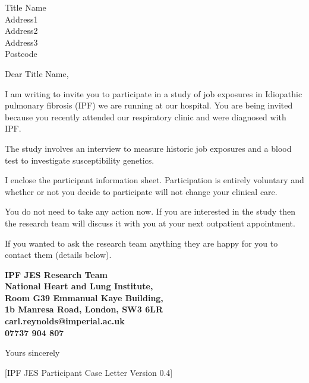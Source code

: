 \documentclass[ipfjes-centre,letterpaper,pagesize,UScommercial9]{scrlttr2}
\begin{document}
\begin{letter}{Title Name \\ Address1 \\ Address2 \\ Address3 \\ Postcode}


\opening{Dear Title Name,}

     I am writing to invite you to participate in a study of job exposures in Idiopathic pulmonary fibrosis (IPF) we are running at our hospital. You are being invited because you recently attended our respiratory clinic and were diagnosed with IPF. 
     
     The study involves an interview to measure historic job exposures and a blood test to investigate susceptibility genetics. 
     
    I enclose the participant information sheet. Participation is entirely voluntary and whether or not you decide to participate will not change your clinical care. 
    
    You do not need to take any action now. If you are interested in the study then the research team will discuss it with you at your next outpatient appointment.

    If you wanted to ask the research team anything they are happy for you to contact them (details below).

    \vspace{1cm}
    \begin{centering}
    \textbf{
    IPF JES Research Team \\  
    National Heart and Lung Institute, \\
    Room G39 Emmanual Kaye Building, \\
    1b Manresa Road, London, SW3 6LR\\
    carl.reynolds@imperial.ac.uk \\
    07737 904 807 \\
    }
    \end{centering}
    \vspace{1cm}

\closing{Yours sincerely}

     \vfill \hfill [IPF JES Participant Case Letter Version 0.4]


\end{letter}
\end{document}

